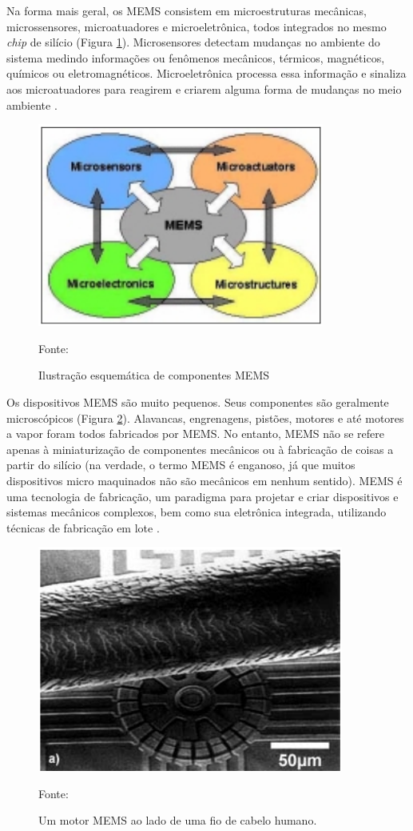 		Na forma mais geral, os MEMS consistem em microestruturas mecânicas, microssensores, microatuadores e microeletrônica, todos integrados no mesmo \textit{chip} de silício (Figura \ref{esquematico_mems}). Microsensores detectam mudanças no ambiente do sistema medindo informações ou fenômenos mecânicos, térmicos, magnéticos, químicos ou eletromagnéticos. Microeletrônica processa essa informação e sinaliza aos microatuadores para reagirem e criarem alguma forma de mudanças no meio ambiente \cite{prime2002}.

		\begin{figure}[h]
			\centering
			\includegraphics[keepaspectratio=true,scale=0.5
			]{figuras/esquematico_mems.png}
			\caption{Ilustração esquemática de componentes MEMS}
			Fonte: \cite{prime2002}
			\label{esquematico_mems}
		\end{figure}

		Os dispositivos MEMS são muito pequenos. Seus componentes são geralmente microscópicos (Figura \ref{escala_mems}). Alavancas, engrenagens, pistões, motores e até motores a vapor foram todos fabricados por MEMS. No entanto, MEMS não se refere apenas à miniaturização de componentes mecânicos ou à fabricação de coisas a partir do silício (na verdade, o termo MEMS é enganoso, já que muitos dispositivos micro maquinados não são mecânicos em nenhum sentido). MEMS é uma tecnologia de fabricação, um paradigma para projetar e criar dispositivos e sistemas mecânicos complexos, bem como sua eletrônica integrada, utilizando técnicas de fabricação em lote \cite{prime2002}.

		\begin{figure}[h]
			\centering
			\includegraphics[keepaspectratio=true,scale=0.5
			]{figuras/escala_mems.png}
			\caption{Um motor MEMS ao lado de uma fio de cabelo humano.}
			Fonte: \cite{prime2002}
			\label{escala_mems}
		\end{figure}

